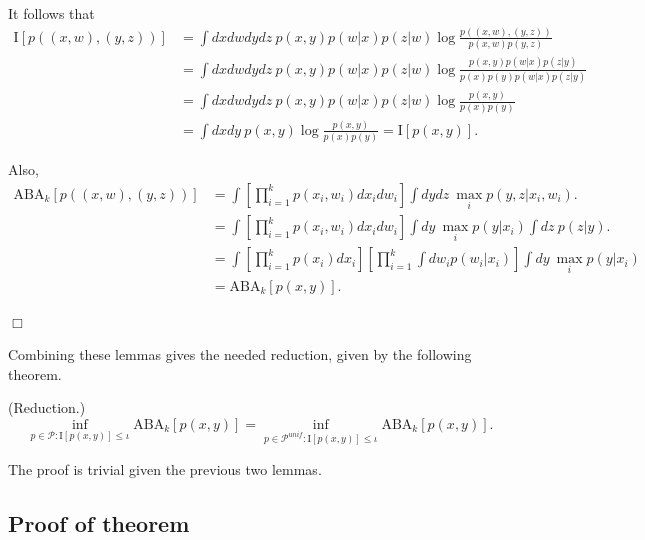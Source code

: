 \documentclass[12pt]{article}
\begin{document}
It follows that
\begin{align*}
\text{I}[p((x,w), (y,z))] &= \int dx dw dy dz  \ p(x,y)p(w|x)p(z|w) \log \frac{p((x,w), (y,z))}{p(x,w)p(y,z)}
\\&= \int dx dw dy dz \ p(x,y)p(w|x)p(z|w) \log \frac{p(x, y)p(w|x)p(z|y)}{p(x)p(y)p(w|x)p(z|y)}
\\&= \int dx dw dy dz \ p(x,y)p(w|x)p(z|w) \log \frac{p(x, y)}{p(x)p(y)}
\\&= \int dx dy \ p(x,y) \log \frac{p(x, y)}{p(x)p(y)} = \text{I}[p(x,y)].
\end{align*}

Also,
\begin{align*}
\text{ABA}_k[p((x,w),(y,z))] 
&= \int \left[\prod_{i=1}^k p(x_i, w_i) dx_i dw_i \right] \int dy dz \ \max_i p(y,z|x_i, w_i).
\\&= \int \left[\prod_{i=1}^k p(x_i, w_i) dx_i dw_i \right] \int dy \ \max_i p(y|x_i) \int dz \ p(z|y).
\\&= \int \left[\prod_{i=1}^k p(x_i) dx_i \right] \left[\prod_{i=1}^k \int dw_i p(w_i|x_i)\right] \int dy \ \max_i p(y|x_i)
\\&= \text{ABA}_k[p(x,y)].
\end{align*}

$\Box$


Combining these lemmas gives the needed reduction, given by the following theorem.

\begin{theorem}\label{theorem:reduction} (Reduction.)
\[
\inf_{p \in \mathcal{P}: \text{I}[p(x,y)] \leq \iota} \text{ABA}_k[p(x,y)] = 
\inf_{p \in \mathcal{P}^{unif}: \text{I}[p(x,y)] \leq \iota} \text{ABA}_k[p(x,y)].
\]
\end{theorem}

The proof is trivial given the previous two lemmas.



\subsection{Proof of theorem}
\end{document}
